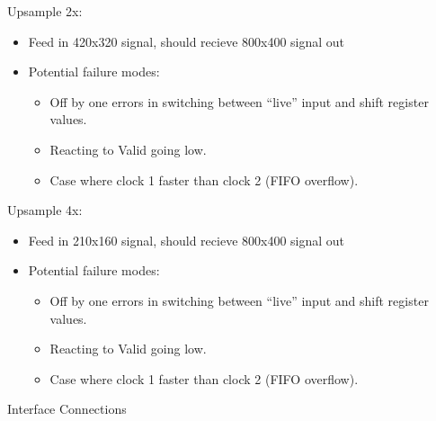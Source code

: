 \documentclass[11pt]{article}
\begin{document}
Upsample 2x:
\begin{itemize}
    \item Feed in 420x320 signal, should recieve 800x400 signal out
    \item Potential failure modes:
        \begin{itemize}
            \item Off by one errors in switching between ``live'' input and shift register values.
            \item Reacting to Valid going low.
            \item Case where clock 1 faster than clock 2 (FIFO overflow).
        \end{itemize}
\end{itemize}


Upsample 4x:
\begin{itemize}
    \item Feed in 210x160 signal, should recieve 800x400 signal out
    \item Potential failure modes:
        \begin{itemize}
            \item Off by one errors in switching between ``live'' input and shift register values.
            \item Reacting to Valid going low.
            \item Case where clock 1 faster than clock 2 (FIFO overflow).
        \end{itemize}
\end{itemize}

Interface Connections
\end{document}
